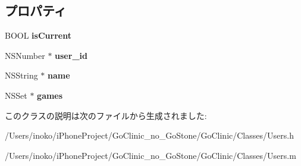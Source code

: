 \subsection*{プロパティ}
\begin{DoxyCompactItemize}
\item 
\hypertarget{interface_users_aa12c1ea063a0e4e75a79a06de21012e5}{
BOOL {\bfseries isCurrent}}
\label{interface_users_aa12c1ea063a0e4e75a79a06de21012e5}

\item 
\hypertarget{interface_users_a2e2333f58b37f146db9e1f3dd734686e}{
NSNumber $\ast$ {\bfseries user\_\-id}}
\label{interface_users_a2e2333f58b37f146db9e1f3dd734686e}

\item 
\hypertarget{interface_users_af92ad80b7b2ebf398881ba5d8311205d}{
NSString $\ast$ {\bfseries name}}
\label{interface_users_af92ad80b7b2ebf398881ba5d8311205d}

\item 
\hypertarget{interface_users_a7fa20e26266b8dd9a9daca4dd67ee7b0}{
NSSet $\ast$ {\bfseries games}}
\label{interface_users_a7fa20e26266b8dd9a9daca4dd67ee7b0}

\end{DoxyCompactItemize}


このクラスの説明は次のファイルから生成されました:\begin{DoxyCompactItemize}
\item 
/Users/inoko/iPhoneProject/GoClinic\_\-no\_\-GoStone/GoClinic/Classes/Users.h\item 
/Users/inoko/iPhoneProject/GoClinic\_\-no\_\-GoStone/GoClinic/Classes/Users.m\end{DoxyCompactItemize}
